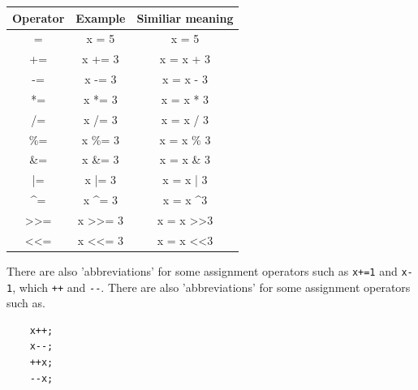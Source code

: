 \begin{center}
	\begin{tabular}{|c|c|c|}
		\hline
		\multicolumn{1}{|l|}{Operator} & \multicolumn{1}{l|}{Example}      & \multicolumn{1}{l|}{Similiar meaning} \\ \hline
		=                              & x = 5                             & x = 5                                 \\ \hline
		+=                             & x += 3                            & x = x + 3                             \\ \hline
		-=                             & x -= 3                            & x = x - 3                             \\ \hline
		*=                             & x *= 3                            & x = x * 3                             \\ \hline
		/=                             & x /= 3                            & x = x / 3                             \\ \hline
		\%=                            & x \%= 3                           & x = x \% 3                            \\ \hline
		\&=                            & x \&= 3                           & x = x \& 3                            \\ \hline
		|=                             & x |= 3                            & x = x | 3                             \\ \hline
		\textasciicircum{}=            & x \textasciicircum{}= 3           & x = x \textasciicircum 3              \\ \hline
		\textgreater{}\textgreater{}=  & x \textgreater{}\textgreater{}= 3 & x = x \textgreater{}\textgreater 3    \\ \hline
		\textless{}\textless{}=        & x \textless{}\textless{}= 3       & x = x \textless{}\textless 3          \\ \hline
	\end{tabular}
\end{center}
There are also 'abbreviations' for some assignment operators such as \verb*|x+=1| and \verb*|x-1|, which \verb*|++| and \verb*|--|. There are also 'abbreviations' for some assignment operators such as.
\begin{verbatim}
    x++;
    x--;
    ++x;
    --x;
\end{verbatim}

